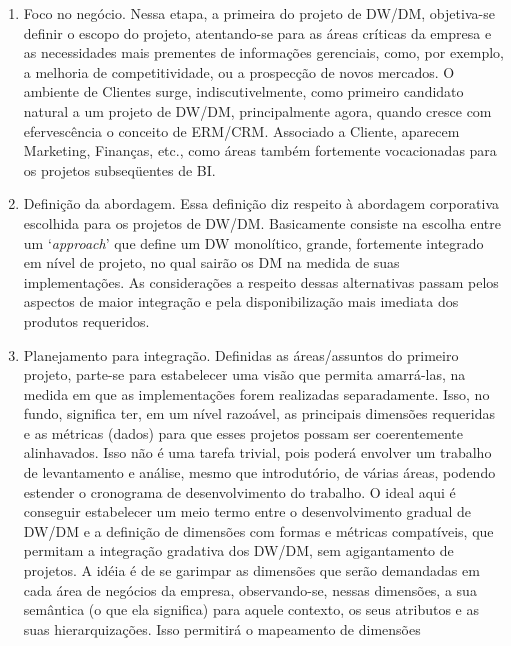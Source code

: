 \documentclass[a4paper]{article}
\newcommand\liststyleWWviiiNumxxv{%
\renewcommand\theenumi{\alph{enumi}}
\renewcommand\theenumii{\alph{enumii}}
\renewcommand\theenumiii{\roman{enumiii}}
\renewcommand\theenumiv{\arabic{enumiv}}
\renewcommand\labelenumi{\theenumi)}
\renewcommand\labelenumii{\theenumii.}
\renewcommand\labelenumiii{\theenumiii.}
\renewcommand\labelenumiv{\theenumiv.}
}
\begin{document}
\liststyleWWviiiNumxxv
\begin{enumerate}
\item {\sffamily
Foco no neg\'ocio. Nessa etapa, a primeira do projeto de DW/DM, objetiva-se definir o escopo do projeto, atentando-se
para as \'areas cr\'iticas da empresa e as necessidades mais prementes de informa\c{c}\~oes gerenciais, como, por
exemplo, a melhoria de competitividade, ou a prospec\c{c}\~ao de novos mercados. O ambiente de Clientes surge,
indiscutivelmente, como primeiro candidato natural a um projeto de DW/DM, principalmente agora, quando cresce com
efervesc\^encia o conceito de ERM/CRM. Associado a Cliente, aparecem Marketing, Finan\c{c}as, etc., como \'areas
tamb\'em fortemente vocacionadas para os projetos subseq\"uentes de BI.}
\item {
\textsf{Defini\c{c}\~ao da abordagem. Essa defini\c{c}\~ao diz respeito \`a abordagem corporativa escolhida para os
projetos de DW/DM. Basicamente consiste na escolha entre um `}\textsf{\textit{approach}}\textsf{{}' que define um DW
monol\'itico, grande, fortemente integrado em n\'ivel de projeto, no qual sair\~ao os DM na medida de suas
implementa\c{c}\~oes. As considera\c{c}\~oes a respeito dessas alternativas passam pelos aspectos de maior
integra\c{c}\~ao e pela disponibiliza\c{c}\~ao mais imediata dos produtos requeridos.}}
\item {
\textsf{Planejamento para integra\c{c}\~ao. Definidas as \'areas/assuntos do primeiro projeto, parte-se para estabelecer
uma vis\~ao que permita amarr\'a-las, na medida em que as implementa\c{c}\~oes forem realizadas separadamente. Isso, no
fundo, significa ter, em um n\'ivel razo\'avel, as principais dimens\~oes requeridas e as m\'etricas (dados) para que
esses projetos possam ser coerentemente alinhavados. Isso n\~ao \'e uma tarefa trivial, pois poder\'a envolver um
trabalho de levantamento e an\'alise, mesmo que introdut\'orio, de v\'arias \'areas, podendo estender o cronograma de
desenvolvimento do trabalho. O ideal aqui \'e conseguir estabelecer um meio termo entre o desenvolvimento gradual de
DW/DM e a defini\c{c}\~ao de dimens\~oes com formas e m\'etricas compat\'iveis, que permitam a integra\c{c}\~ao
gradativa dos DW/DM, sem agigantamento de projetos. A id\'eia \'e de se garimpar as dimens\~oes que ser\~ao demandadas
em cada \'area de neg\'ocios da empresa, observando-se, nessas dimens\~oes, a sua sem\^antica (o que ela significa)
para aquele contexto, os seus atributos e as suas hierarquiza\c{c}\~oes. Isso permitir\'a o mapeamento de dimens\~oes
}}
\end{enumerate}
\end{document}
